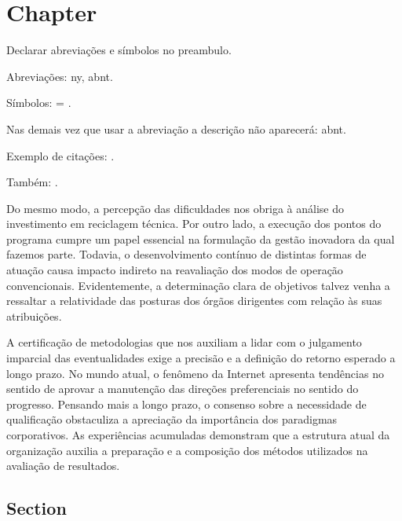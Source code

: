 \documentclass[a5paper,10pt]{udesc}
\begin{document}


%




\chapter{Chapter}

Declarar abreviações e símbolos no preambulo.

Abreviações: \ac{ny}, \ac{abnt}.



Símbolos:   = .


Nas demais vez que usar a abreviação a descrição não aparecerá: \ac{abnt}.

Exemplo de citações: \cite{RW89}.

Também: \cite{CASS99}. 



          Do mesmo modo, a percepção das dificuldades nos obriga à análise do investimento em reciclagem técnica. Por outro lado, a execução dos pontos do programa cumpre um papel essencial na formulação da gestão inovadora da qual fazemos parte. Todavia, o desenvolvimento contínuo de distintas formas de atuação causa impacto indireto na reavaliação dos modos de operação convencionais. Evidentemente, a determinação clara de objetivos talvez venha a ressaltar a relatividade das posturas dos órgãos dirigentes com relação às suas atribuições.




          A certificação de metodologias que nos auxiliam a lidar com o julgamento imparcial das eventualidades exige a precisão e a definição do retorno esperado a longo prazo. No mundo atual, o fenômeno da Internet apresenta tendências no sentido de aprovar a manutenção das direções preferenciais no sentido do progresso. Pensando mais a longo prazo, o consenso sobre a necessidade de qualificação obstaculiza a apreciação da importância dos paradigmas corporativos. As experiências acumuladas demonstram que a estrutura atual da organização auxilia a preparação e a composição dos métodos utilizados na avaliação de resultados.

\section{Section}
\end{document}
